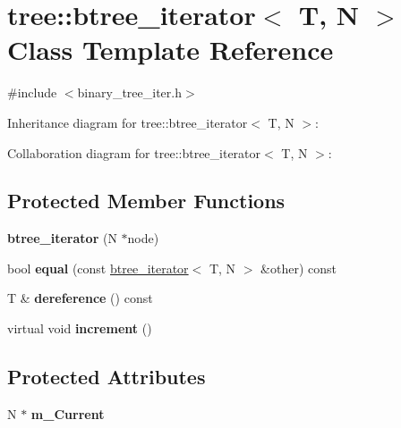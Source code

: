 \hypertarget{classtree_1_1btree__iterator}{\section{tree\-:\-:btree\-\_\-iterator$<$ T, N $>$ Class Template Reference}
\label{classtree_1_1btree__iterator}
}


{\ttfamily \#include $<$binary\-\_\-tree\-\_\-iter.\-h$>$}



Inheritance diagram for tree\-:\-:btree\-\_\-iterator$<$ T, N $>$\-:


Collaboration diagram for tree\-:\-:btree\-\_\-iterator$<$ T, N $>$\-:
\subsection*{Protected Member Functions}
\begin{DoxyCompactItemize}
\item 
\hypertarget{classtree_1_1btree__iterator_a9d7d63a542d5ed607bc93363080b247f}{{\bfseries btree\-\_\-iterator} (N $\ast$node)}\label{classtree_1_1btree__iterator_a9d7d63a542d5ed607bc93363080b247f}

\item 
\hypertarget{classtree_1_1btree__iterator_adaa03d21cddbb44f64abdfcfc92a15b4}{bool {\bfseries equal} (const \hyperlink{classtree_1_1btree__iterator}{btree\-\_\-iterator}$<$ T, N $>$ \&other) const }\label{classtree_1_1btree__iterator_adaa03d21cddbb44f64abdfcfc92a15b4}

\item 
\hypertarget{classtree_1_1btree__iterator_a2614a710559163bd7f8b8b9ea2998073}{T \& {\bfseries dereference} () const }\label{classtree_1_1btree__iterator_a2614a710559163bd7f8b8b9ea2998073}

\item 
\hypertarget{classtree_1_1btree__iterator_ac226882e50211134cae92e2d3a70a05a}{virtual void {\bfseries increment} ()}\label{classtree_1_1btree__iterator_ac226882e50211134cae92e2d3a70a05a}

\end{DoxyCompactItemize}
\subsection*{Protected Attributes}
\begin{DoxyCompactItemize}
\item 
\hypertarget{classtree_1_1btree__iterator_a3fe0a773310404a612dc9a46abfd5471}{N $\ast$ {\bfseries m\-\_\-\-Current}}\label{classtree_1_1btree__iterator_a3fe0a773310404a612dc9a46abfd5471}

\end{DoxyCompactItemize}
